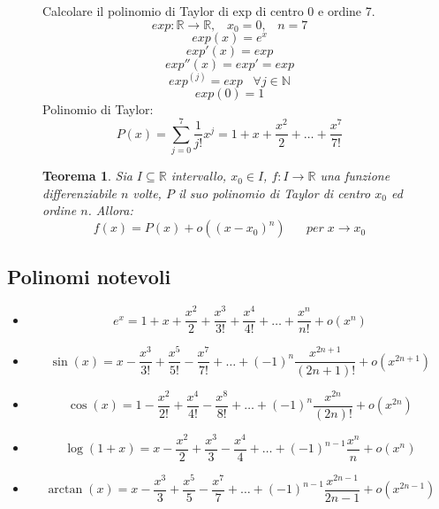 \documentclass[a4paper]{article}
\newtheorem{theorem}{Teorema}
\theoremstyle{break}
\theoremstyle{break}
\theoremstyle{break}
\theoremstyle{break}
\begin{document}
\begin{figure}[H]
  \begin{example}
    Calcolare il polinomio di Taylor di exp di centro 0 e ordine 7.
    \[
      exp: \mathbb{R} \to \mathbb{R}, \;\;\; x_0 = 0,\;\;\; n = 7
    \] 
    \[
      exp(x) = e^x
    \] 
    \[
      exp'(x) = exp
    \] 
    \[
      exp''(x) = exp' = exp
    \] 
    \[
      exp^{(j)} = exp \;\;\; \forall j \in \mathbb{N}
    \] 
    \[
      exp(0) = 1
    \] 
    Polinomio di Taylor:
    \[
      P(x) = \sum_{j=0}^{7} \frac{1}{j!}x^j = 1 + x + \frac{x^2}{2} + \ldots + \frac{x^7}{7!}
    \] 
  \end{example}
\end{figure}

\begin{figure}[H]
  \begin{theorem}
    Sia \( I \subseteq \mathbb{R} \) intervallo, \( x_0 \in I \), \( f: I \to \mathbb{R} \) una
    funzione differenziabile \( n \) volte, \( P \) il suo polinomio di Taylor di centro \( x_0 \) 
    ed ordine \( n \). Allora:
    \[
      f(x) = P(x) + o((x-x_0)^n)\;\;\;\;\;\; per\; x \to x_0
    \] 
  \end{theorem}
\end{figure}

\subsection{Polinomi notevoli}
\begin{itemize}
  \item \[
      e^x = 1+x+\frac{x^2}{2} + \frac{x^3}{3!} + \frac{x^4}{4!} + \ldots + \frac{x^n}{n!} + o(x^n)
    \] 
  \item \[
      \sin(x) = x - \frac{x^3}{3!} + \frac{x^5}{5!} - \frac{x^7}{7!} + \ldots + (-1)^n \frac{x^{2n+1}}{(2n+1)!} + o(x^{2n+1})
    \] 
  \item
    \[
      \cos(x) = 1 - \frac{x^2}{2!} + \frac{x^4}{4!} - \frac{x^8}{8!} + \ldots + (-1)^n \frac{x^{2n}}{(2n)!} + o(x^{2n})
    \] 
  \item
    \[
      \log(1+x) = x - \frac{x^2}{2} + \frac{x^3}{3} - \frac{x^4}{4} + \ldots + (-1)^{n-1} \frac{x^n}{n} + o(x^n)
    \] 
  \item
    \[
      \arctan(x) = x - \frac{x^3}{3} + \frac{x^5}{5} - \frac{x^7}{7} + \ldots + (-1)^{n-1} \frac{x^{2n-1}}{2n-1} + o(x^{2n-1})
    \] 
\end{itemize}
\end{document}
